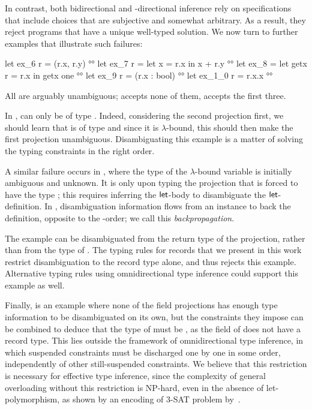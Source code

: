\documentclass[acmsmall,screen,nonacm,review]{acmart}
\begin{document}
%
In contrast, both bidirectional and \Geninst-directional inference
rely on specifications that include choices that are subjective
and somewhat arbitrary. As a result, they reject programs
that have a unique well-typed solution. We now turn to
further examples that illustrate such failures:
%
\locallabelreset
%
\begin{program}
let ex_6 r = (r.x, r.y)                          	   °°
let ex_7 r = let x = r.x in x + r.y              	   °°
let ex_8 = let getx r = r.x in getx one                    °°
let ex_9 r = (r.x : bool)                        	   °°
let ex_1_0 r = r.x.x                              	   °°
\end{program}
All are arguably unambiguous; \OCaml accepts none of them, \OML accepts the first three.

In ,  can only be of type . Indeed,
considering the second projection first, we should learn that
 is of type  and since it is $\lambda$-bound, this
should then make the first projection unambiguous. Disambiguating this example is a matter
of solving the typing constraints in the right order.

A similar failure occurs in , where the type of the
$\lambda$-bound variable  is initially ambiguous and
unknown. It is only upon typing the projection  that
 is forced to have the type ; this requires
inferring the $\mathopen{}\mathrel{\mathsf{let}}$-body to disambiguate the $\mathopen{}\mathrel{\mathsf{let}}$-definition.
%
In , disambiguation information flows from an instance to
back the definition, opposite to the \Geninst-order; we call this
\emph{backpropagation}.

The example  can be disambiguated from the return type of
the projection, rather than from the type of . The typing rules for
records that we present in this work restrict disambiguation to the
record type alone, and thus rejects this example. Alternative typing rules
using omnidirectional type inference could support this example as
well.

Finally,  is an example where none of the field
projections has enough type information to be disambiguated on its own, but the
constraints they impose can be combined to deduce that the type of
 must be , as the  field of 
does not have a record type. This lies outside the framework of
omnidirectional type inference, in which suspended constraints must be
discharged one by one in some order, independently of other
still-suspended constraints.
%
We believe that this restriction is necessary for effective type inference,
since the complexity of general overloading without this restriction is
NP-hard, even in the absence of let-polymorphism, as shown by an encoding of
3-SAT problem by~\citet*
{Chargueraud-Bodin-Dunfield-Riboulet/jfla2025}.
\end{document}
